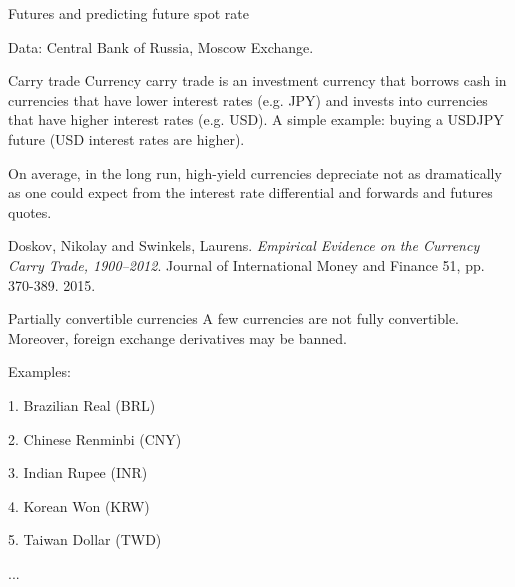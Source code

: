 \documentclass{beamer}
\begin{document}
\begin{frame}{Futures and predicting future spot rate}
\center
{}

\scriptsize Data: Central Bank of Russia, Moscow Exchange.
\end{frame}




\begin{frame}{Carry trade}
\justify
\alert{Currency carry trade} is an investment currency that borrows cash in currencies that have lower interest rates (e.g. JPY) and invests into currencies that have higher interest rates (e.g. USD). A simple example: buying a USDJPY future (USD interest rates are higher).

\justify
On average, in the long run, high-yield currencies depreciate not as dramatically as one could expect from the interest rate differential and forwards and futures quotes.

\justify
Doskov, Nikolay and Swinkels, Laurens. \textit{Empirical Evidence on the Currency Carry Trade, 1900--2012}. Journal of International Money and Finance 51, pp. 370-389. 2015.

\end{frame}



\begin{frame}{Partially convertible currencies}
\justify
A few currencies are not fully convertible. Moreover, foreign exchange derivatives may be banned.

\justify
Examples:

1. Brazilian Real (BRL)

2. Chinese Renminbi (CNY)

3. Indian Rupee (INR)

4. Korean Won (KRW)

5. Taiwan Dollar (TWD)

...

\end{frame}
\end{document}

